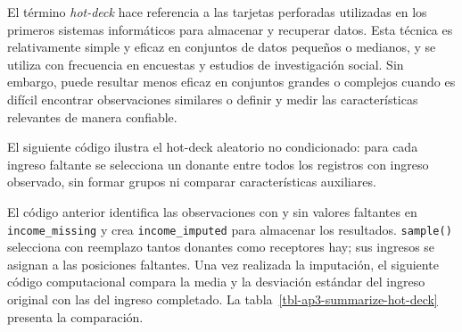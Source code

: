 \documentclass[
  spanish,
  11pt,
  letterpaper,
  oneside,
  open=any]{scrbook}
\newenvironment{Shaded}{\begin{snugshade}}{\end{snugshade}}
\newcommand{\AttributeTok}[1]{\textcolor[rgb]{0.40,0.45,0.13}{#1}}
\newcommand{\ConstantTok}[1]{\textcolor[rgb]{0.56,0.35,0.01}{#1}}
\newcommand{\DecValTok}[1]{\textcolor[rgb]{0.68,0.00,0.00}{#1}}
\newcommand{\FunctionTok}[1]{\textcolor[rgb]{0.28,0.35,0.67}{#1}}
\newcommand{\NormalTok}[1]{\textcolor[rgb]{0.00,0.23,0.31}{#1}}
\newcommand{\OtherTok}[1]{\textcolor[rgb]{0.00,0.23,0.31}{#1}}
\newcommand{\SpecialCharTok}[1]{\textcolor[rgb]{0.37,0.37,0.37}{#1}}
\begin{document}
El término \emph{hot-deck} hace referencia a las tarjetas perforadas
utilizadas en los primeros sistemas informáticos para almacenar y
recuperar datos. Esta técnica es relativamente simple y eficaz en
conjuntos de datos pequeños o medianos, y se utiliza con frecuencia en
encuestas y estudios de investigación social. Sin embargo, puede
resultar menos eficaz en conjuntos grandes o complejos cuando es difícil
encontrar observaciones similares o definir y medir las características
relevantes de manera confiable.

El siguiente código ilustra el hot-deck aleatorio no condicionado: para
cada ingreso faltante se selecciona un donante entre todos los registros
con ingreso observado, sin formar grupos ni comparar características
auxiliares.

\begin{Shaded}
\end{Shaded}

El código anterior identifica las observaciones con y sin valores
faltantes en \texttt{income\_missing} y crea \texttt{income\_imputed}
para almacenar los resultados. \texttt{sample()} selecciona con
reemplazo tantos donantes como receptores hay; sus ingresos se asignan a
las posiciones faltantes. Una vez realizada la imputación, el siguiente
código computacional compara la media y la desviación estándar del
ingreso original con las del ingreso completado. La
tabla~\ref{tbl-ap3-summarize-hot-deck} presenta la comparación.
\end{document}
